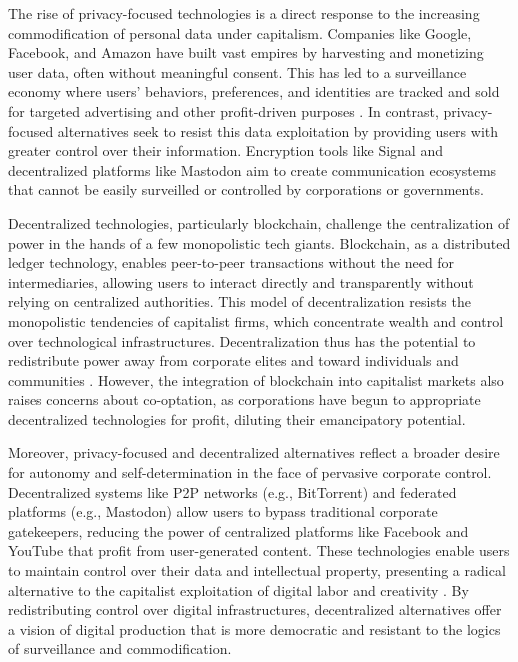 The rise of privacy-focused technologies is a direct response to the increasing commodification of personal data under capitalism. Companies like Google, Facebook, and Amazon have built vast empires by harvesting and monetizing user data, often without meaningful consent. This has led to a surveillance economy where users' behaviors, preferences, and identities are tracked and sold for targeted advertising and other profit-driven purposes \cite[pp.~151-153]{zuboff2019}. In contrast, privacy-focused alternatives seek to resist this data exploitation by providing users with greater control over their information. Encryption tools like Signal and decentralized platforms like Mastodon aim to create communication ecosystems that cannot be easily surveilled or controlled by corporations or governments.

Decentralized technologies, particularly blockchain, challenge the centralization of power in the hands of a few monopolistic tech giants. Blockchain, as a distributed ledger technology, enables peer-to-peer transactions without the need for intermediaries, allowing users to interact directly and transparently without relying on centralized authorities. This model of decentralization resists the monopolistic tendencies of capitalist firms, which concentrate wealth and control over technological infrastructures. Decentralization thus has the potential to redistribute power away from corporate elites and toward individuals and communities \cite[pp.~67-69]{tapscott2016}. However, the integration of blockchain into capitalist markets also raises concerns about co-optation, as corporations have begun to appropriate decentralized technologies for profit, diluting their emancipatory potential.

Moreover, privacy-focused and decentralized alternatives reflect a broader desire for autonomy and self-determination in the face of pervasive corporate control. Decentralized systems like P2P networks (e.g., BitTorrent) and federated platforms (e.g., Mastodon) allow users to bypass traditional corporate gatekeepers, reducing the power of centralized platforms like Facebook and YouTube that profit from user-generated content. These technologies enable users to maintain control over their data and intellectual property, presenting a radical alternative to the capitalist exploitation of digital labor and creativity \cite[pp.~203-205]{hardt2000}. By redistributing control over digital infrastructures, decentralized alternatives offer a vision of digital production that is more democratic and resistant to the logics of surveillance and commodification.


